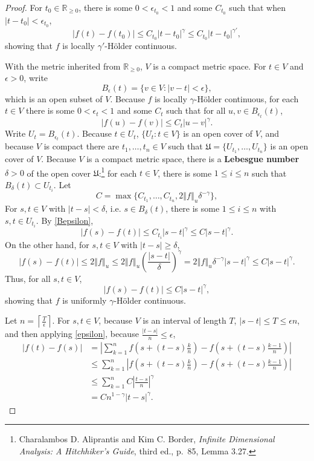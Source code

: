 \documentclass{article}
\newcommand{\norm}[1]{\left\Vert #1 \right\Vert}
\theoremstyle{definition}
\theoremstyle{definition}
\begin{document}
\begin{proof}
For $t_0 \in \mathbb{R}_{\geq 0}$, there is some $0<\epsilon_{t_0}<1$ and some $C_{t_0}$ such that when
$|t-t_0|< \epsilon_{t_0}$,
\[
|f(t)-f(t_0)| \leq C_{t_0} |t-t_0|^\gamma \leq C_{t_0} |t-t_0|^{\gamma'},
\]
showing that $f$ is locally $\gamma'$-H\"older continuous.


With the metric inherited from $\mathbb{R}_{\geq 0}$, $V$ is a compact  metric space. 
For $t \in V$ and $\epsilon>0$, write
\[
B_\epsilon(t) = \{v \in V: |v-t| < \epsilon\},
\]
which is an open subset of $V$.
Because $f$ is locally $\gamma$-H\"older continuous, for each $t \in V$ there is some $0<\epsilon_t<1$ and some
$C_t$ such that for all $u,v \in B_{\epsilon_t}(t)$,
\begin{equation}
|f(u)-f(v)| \leq C_t |u-v|^\gamma.
\label{Bepsilon}
\end{equation}
Write $U_t=B_{\epsilon_t}(t)$. Because $t \in U_t$, 
$\{U_t: t \in V\}$ is an open cover of $V$, and because $V$ is compact there are $t_1,\ldots,t_n \in V$ such that
$\mathfrak{U}=\{U_{t_1},\ldots,U_{t_n}\}$ is an open cover of $V$.
Because $V$ is a compact metric space, there is a \textbf{Lebesgue number} $\delta>0$ of the open cover $\mathfrak{U}$:\footnote{Charalambos D. Aliprantis
and Kim C. Border, {\em Infinite Dimensional Analysis: A Hitchhiker's Guide}, third ed., p.~85, Lemma 3.27.}
for each $t \in V$, there is some $1 \leq i \leq n$ such that $B_\delta(t) \subset U_{t_i}$. 
Let 
\[
C = \max\{C_{t_1},\ldots,C_{t_n},2\norm{f}_u \delta^{-\gamma}\},
\]
 For $s,t \in V$ with $|t-s| < \delta$, i.e.
  $s \in B_\delta(t)$, there is some $1 \leq i \leq n$ with
 $s,t \in U_{t_i}$. By \eqref{Bepsilon},
 \[
 |f(s)-f(t)| \leq C_{t_i} |s-t|^\gamma \leq C|s-t|^\gamma.
 \]
 On the other hand, for $s,t \in V$ with $|t-s| \geq \delta$, 
 \[
 |f(s)-f(t)| \leq 2 \norm{f}_u  \leq 2 \norm{f}_u \left(\frac{|s-t|}{\delta} \right)^\gamma 
 =2\norm{f}_u \delta^{-\gamma} |s-t|^\gamma
 \leq C|s-t|^\gamma.
 \]
 Thus, for all $s,t \in V$, 
 \[
 |f(s)-f(t)| \leq C |s-t|^\gamma,
 \]
 showing that $f$ is uniformly $\gamma$-H\"older continuous.
 
 Let $n = \left\lceil \frac{T}{\epsilon} \right\rceil$. For $s,t \in V$, because $V$ is an interval of length $T$, 
 $|s-t| \leq T \leq \epsilon n$, and then applying \eqref{epsilon}, because $\frac{|t-s|}{n} \leq \epsilon$,
\begin{align*}
|f(t)-f(s)|&= \left| \sum_{k=1}^n f\left(s+(t-s)\frac{k}{n}\right)-f\left(s+(t-s)\frac{k-1}{n}\right)\right|\\
&\leq \sum_{k=1}^n \left| f\left(s+(t-s)\frac{k}{n}\right)-f\left(s+(t-s)\frac{k-1}{n}\right)\right|\\
&\leq \sum_{k=1}^n C\left|\frac{t-s}{n}\right|^\gamma\\
&=C n^{1-\gamma} |t-s|^\gamma.
\end{align*}
\end{proof}
\end{document}
